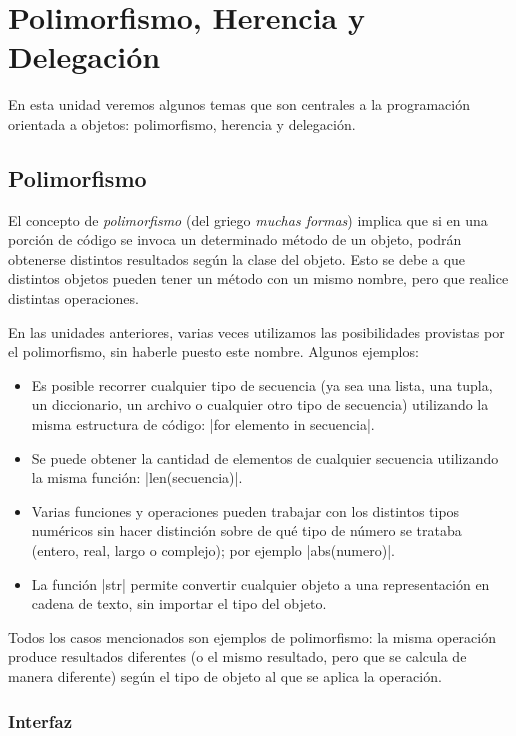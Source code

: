 \chapter{Polimorfismo, Herencia y Delegación}

En esta unidad veremos algunos temas que son centrales a la programación
orientada a objetos: polimorfismo, herencia y delegación.

\section{Polimorfismo}

El concepto de {\it polimorfismo} (del griego {\it muchas formas}) implica
que si en una porción de código se invoca un determinado método de un
objeto, podrán obtenerse distintos resultados según la clase del objeto.
Esto se debe a que distintos objetos pueden tener un método con un mismo
nombre, pero que realice distintas operaciones.

En las unidades anteriores, varias veces utilizamos las posibilidades
provistas por el polimorfismo, sin haberle puesto este nombre. Algunos
ejemplos:

\begin{itemize}
\item Es posible recorrer cualquier tipo de secuencia
(ya sea una lista, una tupla, un diccionario, un archivo o cualquier otro tipo
de secuencia) utilizando la misma estructura de código:
|for elemento in secuencia|.

\item Se puede obtener la cantidad de
elementos de cualquier secuencia utilizando la misma función: |len(secuencia)|.

\item Varias funciones y operaciones pueden trabajar con los
distintos tipos numéricos sin hacer distinción sobre de qué tipo de número
se trataba (entero, real, largo o complejo); por ejemplo |abs(numero)|.

\item La función |str| permite convertir cualquier objeto a una representación
en cadena de texto, sin importar el tipo del objeto.
\end{itemize}

Todos los casos mencionados son ejemplos de polimorfismo: la misma operación
produce resultados diferentes (o el mismo resultado, pero que se calcula de
manera diferente) según el tipo de objeto al que se aplica la operación.

\subsection{Interfaz}

